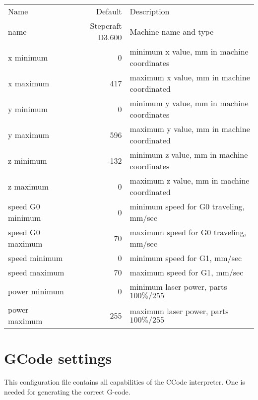 \begin{tabular}{lrl}
    Name      & Default          & Description\\
    name      & Stepcraft D3.600 & Machine name and type\\
    x minimum &                0 & minimum x value, mm in machine coordinates\\
    x maximum &              417 & maximum x value, mm in machine coordinated\\
    y minimum &                0 & minimum y value, mm in machine coordinates\\
    y maximum &              596 & maximum y value, mm in machine coordinated\\
    z minimum &             -132 & minimum z value, mm in machine coordinates\\
    z maximum &                0 & maximum z value, mm in machine coordinated\\
    speed G0 minimum &         0 & minimum speed for G0 traveling, mm/sec\\
    speed G0 maximum &        70 & maximum speed for G0 traveling, mm/sec\\
    speed minimum &            0 & minimum speed for G1, mm/sec\\
    speed maximum &           70 & maximum speed for G1, mm/sec\\
    power minimum &            0 & minimum laser power, parts $100\%/255$\\
    power maximum &          255 & maximum laser power, parts $100\%/255$\\
\end{tabular}

\section{GCode settings}
This configuration file contains all capabilities of the CCode interpreter.
One is needed for generating the correct G-code.


